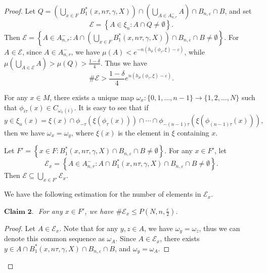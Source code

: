 \documentclass[10pt,a4paper]{amsart}
\begin{document}
\begin{proof}
Let
\(
Q = \left( \bigcup\limits_{x \in F} B_1^*(x, n\tau, \gamma, X) \right) \cap \left( \bigcup\limits_{A \in A^-_{n, r}} A \right) \cap B_{n, \varepsilon} \cap B \), and set
\[
\mathcal{E} = \left\{ A \in \xi_{n} : A \cap Q \neq \emptyset \right\}.
\]
Then \( \mathcal{E} = \left\{ A \in A^-_{n,r} : A \cap \left( \bigcup\limits_{x \in F} B_1^*(x, n\tau, \gamma, X) \right) \cap B_{n,\varepsilon} \cap B \neq \emptyset \right\} \). For \( A \in \mathcal{E} \), since \( A \in {A}_{n,r}^- \), we have \( \mu(A) < e^{-n(h_\mu(\phi_\tau, \xi) - \varepsilon)} \), while \( \mu\left( \bigcup\limits_{A \in \mathcal{E}} A \right) > \mu(Q) > \frac{1 - \delta}{4} \). Thus we have
\[
\#\mathcal{E} > \frac{1 - \delta}{4} e^{n(h_\mu(\phi_\tau, \xi) - \varepsilon)}.
\]

For any \( x \in M \), there exists a unique map \( \omega_x: \{0, 1, \ldots, n - 1\} \to \{1, 2, \ldots, N\} \) such that \( \phi_{i\tau}(x)\in C_{\omega_x(i)} \). It is easy to see that if
\[
y \in \xi_n(x) = \xi(x) \cap \phi_{-\tau}(\xi(\phi_\tau(x))) \cap \cdots \cap \phi_{-(n-1)\tau}(\xi(\phi_{(n-1)\tau}(x))),
\]
then we have \( \omega_x = \omega_y \), where \( \xi(x) \) is the element in \( \xi \) containing \( x \).

Let \( F' = \left\{ x \in F : B_1^*(x, n\tau, \gamma, X) \cap B_{n,\varepsilon} \cap B \neq \emptyset \right\} \). For any \( x \in F' \), let
\[
\mathcal{E}_x = \left\{ A \in {A}_{n,r}^- : A \cap B_1^*(x, n\tau, \gamma, X) \cap B_{n,\varepsilon} \cap B \neq \emptyset \right\}. \tag{4}
\]
Then \( \mathcal{E} \subseteq \bigcup\limits_{x \in F'} \mathcal{E}_x \).

We have the following estimation for the number of elements in \( \mathcal{E}_x \).

\bigskip
\noindent
\(\textbf{Claim 2. }\) {\it For any \( x \in F' \), we have \( \#\mathcal{E}_x \leq P(N, n, \frac{\varepsilon}{2}) \).}



\begin{proof}
Let \( A \in \mathcal{E}_x \). Note that for any \( y, z \in A \), we  have \( \omega_y = \omega_z \), thus we can denote this common sequence as \( \omega_A \). Since \( A \in \mathcal{E}_x \), there exists \( y \in A \cap B_1^*(x, n\tau, \gamma, X) \cap B_{n, \varepsilon} \cap B \), and \( \omega_y = \omega_A \).


\end{proof}
\end{proof}
\end{document}
